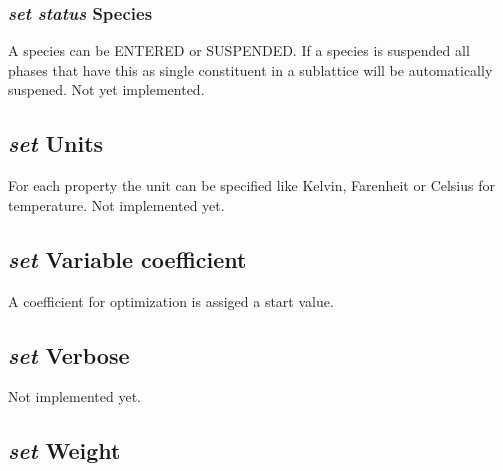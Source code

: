 \documentclass[12pt]{article}
\begin{document}
\subsubsection{{\em set status} Species}

A species can be ENTERED or SUSPENDED.  If a species is suspended
all phases that have this as single constituent in a sublattice
will be automatically suspened.  Not yet implemented.

\subsection{{\em set} Units}

For each property the unit can be specified like Kelvin, Farenheit or
Celsius for temperature.  Not implemented yet.

\subsection{{\em set} Variable coefficient}

A coefficient for optimization is assiged a start value.

\subsection{{\em set} Verbose}

Not implemented yet.

\subsection{{\em set} Weight}
\end{document}
